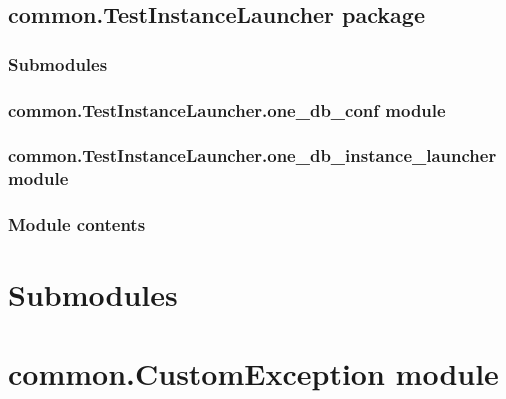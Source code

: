 \documentclass[letterpaper,10pt,english]{sphinxmanual}
\begin{document}
\subsection{common.TestInstanceLauncher package}
\label{\detokenize{common.TestInstanceLauncher:common-testinstancelauncher-package}}\label{\detokenize{common.TestInstanceLauncher::doc}}

\subsubsection{Submodules}
\label{\detokenize{common.TestInstanceLauncher:submodules}}

\subsubsection{common.TestInstanceLauncher.one\_db\_conf module}
\label{\detokenize{common.TestInstanceLauncher:common-testinstancelauncher-one-db-conf-module}}

\subsubsection{common.TestInstanceLauncher.one\_db\_instance\_launcher module}
\label{\detokenize{common.TestInstanceLauncher:common-testinstancelauncher-one-db-instance-launcher-module}}

\subsubsection{Module contents}
\label{\detokenize{common.TestInstanceLauncher:module-common.TestInstanceLauncher}}\label{\detokenize{common.TestInstanceLauncher:module-contents}}

\section{Submodules}
\label{\detokenize{common:submodules}}

\section{common.CustomException module}
\label{\detokenize{common:module-common.CustomException}}\label{\detokenize{common:common-customexception-module}}
\end{document}
